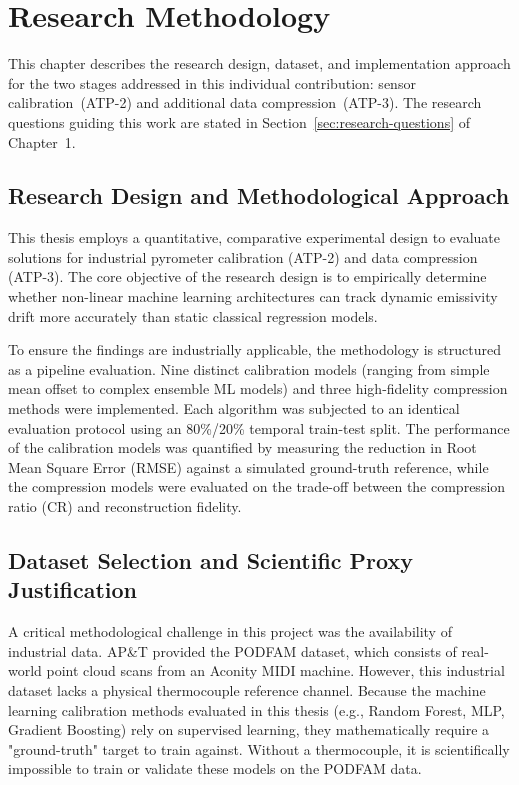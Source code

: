 \chapter{Research Methodology}
\label{cha:methodology}

This chapter describes the research design, dataset, and implementation approach for the two stages addressed in this individual contribution: sensor calibration~(ATP-2) and additional data compression~(ATP-3). The research questions guiding this work are stated in Section~\ref{sec:research-questions} of Chapter~1.

\section{Research Design and Methodological Approach}
\label{sec:research_design}

This thesis employs a quantitative, comparative experimental design to evaluate solutions for industrial pyrometer calibration (ATP-2) and data compression (ATP-3). The core objective of the research design is to empirically determine whether non-linear machine learning architectures can track dynamic emissivity drift more accurately than static classical regression models.

To ensure the findings are industrially applicable, the methodology is structured as a pipeline evaluation. Nine distinct calibration models (ranging from simple mean offset to complex ensemble ML models) and three high-fidelity compression methods were implemented. Each algorithm was subjected to an identical evaluation protocol using an 80\%/20\% temporal train-test split. The performance of the calibration models was quantified by measuring the reduction in Root Mean Square Error (RMSE) against a simulated ground-truth reference, while the compression models were evaluated on the trade-off between the compression ratio (CR) and reconstruction fidelity.

\section{Dataset Selection and Scientific Proxy Justification}
\label{sec:dataset}

A critical methodological challenge in this project was the availability of industrial data. AP\&T provided the PODFAM dataset, which consists of real-world point cloud scans from an Aconity MIDI machine. However, this industrial dataset lacks a physical thermocouple reference channel. Because the machine learning calibration methods evaluated in this thesis (e.g., Random Forest, MLP, Gradient Boosting) rely on supervised learning, they mathematically require a "ground-truth" target to train against. Without a thermocouple, it is scientifically impossible to train or validate these models on the PODFAM data.

